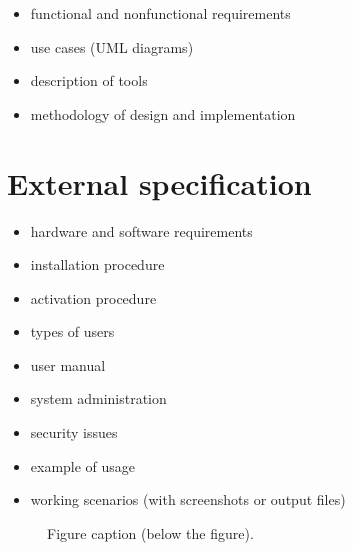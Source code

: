 \documentclass[a4paper,twoside,12pt]{book}
\begin{document}
\begin{itemize}
\item functional and nonfunctional requirements
\item use cases (UML diagrams)
\item description of tools
\item methodology of design and implementation
\end{itemize} 

\chapter{External specification}
\begin{itemize}
\item hardware and software requirements
\item installation procedure
\item activation procedure
\item types of users
\item user manual
\item system administration
\item security issues
\item example of usage
\item working scenarios (with screenshots or output files)
\end{itemize}



 
\begin{figure}
\centering
{}
\caption{Figure caption (below the figure).}
\label{fig:2}
\end{figure}
\end{document}
